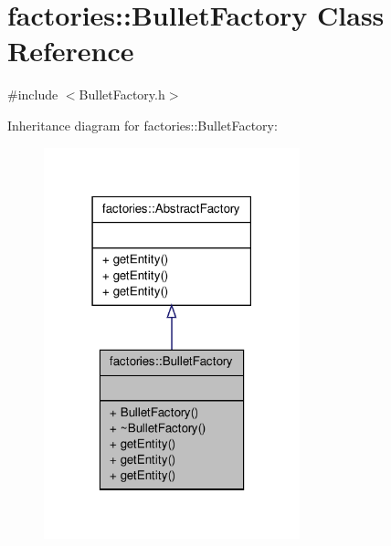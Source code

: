 \hypertarget{classfactories_1_1BulletFactory}{\section{factories\-:\-:\-Bullet\-Factory \-Class \-Reference}
\label{db/db2/classfactories_1_1BulletFactory}
}


{\ttfamily \#include $<$\-Bullet\-Factory.\-h$>$}



\-Inheritance diagram for factories\-:\-:\-Bullet\-Factory\-:\nopagebreak
\begin{figure}[H]
\begin{center}
\leavevmode
\includegraphics[width=210pt]{d7/d8a/classfactories_1_1BulletFactory__inherit__graph}
\end{center}
\end{figure}



